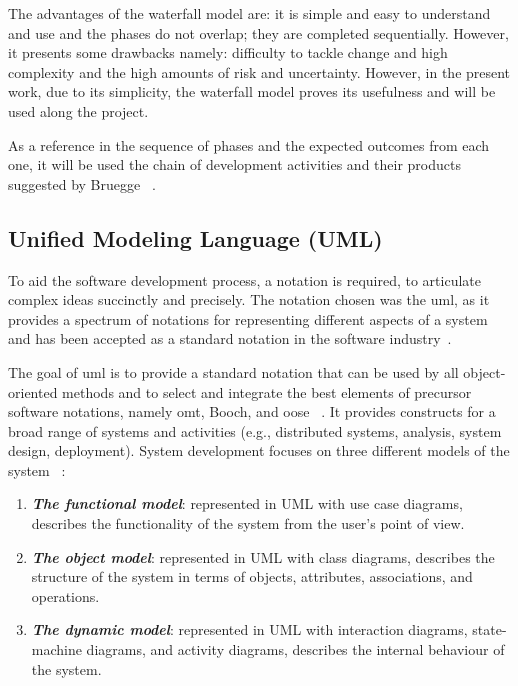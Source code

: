 The advantages of the waterfall model are: it is simple and easy to understand
and use and the phases do not overlap; they are completed sequentially. However,
it presents some drawbacks namely: difficulty to tackle change and high
complexity and the high amounts of risk and uncertainty. However, in the present
work, due to its simplicity, the waterfall model proves its usefulness and will
be used along the project.

As a reference in the sequence of phases and the expected outcomes from each
one, it will be used the chain of development activities and their products
suggested by Bruegge
~\cite{bruegge2004object}.

%
\subsection{Unified Modeling Language (UML)}%
\label{subsec:uml}
To aid the software development process, a notation is required, to articulate
complex ideas succinctly and precisely. The notation chosen was the \gls{uml},
as it provides a spectrum of notations for representing different aspects of a
system and has been accepted as a standard notation in the software
industry~\cite{bruegge2004object}.

The goal of \gls{uml} is to provide a standard notation that can be used by all
object- oriented methods and to select and integrate the best elements of
precursor software notations, namely \gls{omt}, Booch, and \gls{oose}
~\cite{bruegge2004object}. It provides
constructs for a broad range of systems and activities (e.g., distributed
systems, analysis, system design, deployment). System development focuses on
three different models of the system
~\cite{bruegge2004object}:
\begin{enumerate}
  \item \textbf{\emph{The functional model}}: represented in UML with use case
    diagrams, describes the functionality of the system from the user's point of
    view.
  \item \textbf{\emph{The object model}}: represented in UML with class
    diagrams, describes the structure of the system in terms of objects,
    attributes, associations, and operations.  
  \item \textbf{\emph{The dynamic model}}: represented in UML with interaction
    diagrams, state-machine diagrams, and activity diagrams, describes the
    internal behaviour of the system.
  \end{enumerate}

